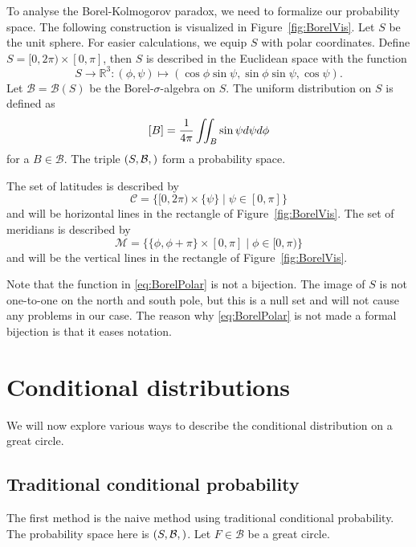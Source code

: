 \documentclass[a4paper]{report}
\theoremstyle{plain}
\theoremstyle{definition}
\theoremstyle{remark}
\numberwithin{equation}{chapter}
\newcommand{\R}{\mathbb{R}}
\let\P\relax
\DeclareMathOperator{\P}{\mathbb{P}}
\DeclareMathOperator{\1}{\mathbbm{1}}
\newcommand{\B}{\mathcal{B}}
\begin{document}
To analyse the Borel-Kolmogorov paradox, we need to formalize our probability space. The following construction is visualized in Figure~\ref{fig:BorelVis}. Let $S$ be the unit sphere. For easier calculations, we equip $S$ with polar coordinates. Define $S=[0,2\pi)\times[0,\pi]$, then $S$ is described in the Euclidean space with the function
\begin{equation}\label{eq:BorelPolar}
S\to\R^3:(\phi,\psi)\mapsto(\cos\phi\sin\psi,\sin\phi\sin\psi,\cos\psi).
\end{equation}
Let $\B=\B(S)$ be the Borel-$\sigma$-algebra on $S$. The uniform distribution on $S$ is defined as
\begin{equation}
\P[B]=\frac{1}{4\pi}\iint_B\sin\psi d\psi d\phi
\end{equation}
for a $B\in\B$. The triple $(S,\B,\P)$ form a probability space.

The set of latitudes is described by
\begin{equation}
\mathcal{C}=\{[0,2\pi)\times\{\psi\}\mid\psi\in[0,\pi]\}
\end{equation}
and will be horizontal lines in the rectangle of Figure~\ref{fig:BorelVis}. The set of meridians is described by
\begin{equation}
\mathcal{M}=\{\{\phi,\phi+\pi\}\times[0,\pi]\mid\phi\in[0,\pi)\}
\end{equation}
and will be the vertical lines in the rectangle of Figure~\ref{fig:BorelVis}.

Note that the function in \eqref{eq:BorelPolar} is not a bijection. The image of $S$ is not one-to-one on the north and south pole, but this is a null set and will not cause any problems in our case. The reason why \eqref{eq:BorelPolar} is not made a formal bijection is that it eases notation.

\section{Conditional distributions}
We will now explore various ways to describe the conditional distribution on a great circle.
\subsection{Traditional conditional probability}\label{sec:BorelNaive}
The first method is the naive method using traditional conditional probability. The probability space here is $(S,\B,\P)$. Let $F\in\B$ be a great circle.
\end{document}
